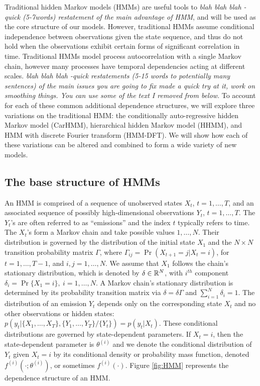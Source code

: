 
Traditional hidden Markov models (HMMs) are useful tools to \textit{blah blah blah - quick (5-7words) restatement of the main advantage of HMM}, and will be used as the core structure of our models.
However, traditional HMMs assume conditional independence between observations given the state sequence, and thus do not hold when the observations exhibit certain forms of significant correlation in time. Traditional HMMs model process autocorrelation with a single Markov chain, however many processes have temporal dependencies acting at different scales. \textit{blah blah blah -quick restatements (5-15 words to potentially many sentences) of the main issues you are going to fix made a quick try at it, work on smoothing things. You can use some of the text I removed from below}. 
To account for each of these common additional dependence structures, we will explore three variations on the traditional HMM: the conditionally auto-regressive hidden Markov model (CarHMM), hierarchical hidden Markov model (HHMM), and HMM with discrete Fourier transform (HMM-DFT). We will show how each of these variations can be altered and combined to form a wide variety of new models.

\subsection{The base structure of HMMs}

An HMM is comprised of a sequence of unobserved states $X_t$, $t = 1, \ldots, T$, and an associated sequence of  possibly high-dimensional observations $Y_t$, $t = 1, \ldots, T$.
The $Y_t$'s are often referred to as ``emissions'' and the index $t$ typically refers to time. 
The $X_t$'s form a Markov chain and take possible values $1, \ldots, N$. Their distribution is governed by the distribution of the initial state $X_1$ and the $N \times N$ transition probability matrix $\Gamma$, where $\Gamma_{ij} = \Pr(X_{t+1} = j | X_t = i)$, for $t=1,\ldots, T-1$, and $i, j = 1,\ldots, N$. 
%
We assume that $X_1$ follows the chain's stationary distribution, which is denoted by $\delta \in \mathbb{R}^N$, with $i^{th}$ component
$\delta_i = \Pr\{X_1 = i\},~ i = 1,\ldots,N.$
A Markov chain's stationary distribution is determined by its probability transition matrix via $\delta = \delta \Gamma$ and $\sum_{i=1}^N \delta_i = 1$.
%
The distribution of an emission $Y_t$ depends only on the corresponding state $X_t$ and no other observations or hidden states: $p\left(y_t|\{X_1,\ldots, X_T\},\{Y_1,\ldots, Y_T\}/ \{Y_t\}\right) = p(y_t|X_t)$.
%
These conditional distributions are governed by state-dependent parameters. If $X_t = i$, then the state-dependent parameter is $\theta^{(i)}$ and we denote the conditional distribution of $Y_t$ given $X_t=i$ by its conditional density or probability mass function, denoted $f^{(i)}(\cdot ; \theta^{(i)})$, or sometimes  $f^{(i)}(\cdot)$.
%
Figure \ref{fig:HMM} represents the dependence structure of an HMM.

